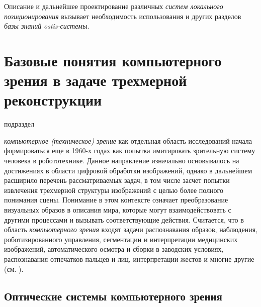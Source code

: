 Описание и дальнейшее проектирование различных \textit{систем локального позиционирования} вызывает необходимость использования и других разделов \textit{базы знаний} \textit{ostis-системы}. 

\section{Базовые понятия компьютерного зрения в задаче трехмерной реконструкции}
\label{sec_3d_models_computervision}

\begin{scnrelfromlist}{подраздел}
\end{scnrelfromlist}

\textit{компьютерное (техническое) зрение} как отдельная область исследований начала формироваться еще в 1960-х годах как попытка имитировать зрительную систему человека в робототехнике. Данное направление изначально основывалось на достижениях в области цифровой обработки изображений, однако в дальнейшем расширило перечень рассматриваемых задач, в том числе засчет попытки извлечения трехмерной структуры изображений с целью более полного понимания сцены. Понимание в этом контексте означает преобразование визуальных образов в описания мира, которые могут взаимодействовать с другими процессами и вызывать соответствующие действия. Считается, что в область \textit{компьютерного зрения} входят задачи распознавания образов, наблюдения, роботизированного управления, сегментации и интерпретации медицинских изображений, автоматического осмотра и сборки в заводских условиях, распознавания отпечатков пальцев и лиц, интерпретации жестов и многие другие (см. ).

\begin{SCn}
\end{SCn}

\subsection{Оптические системы компьютерного зрения}
\label{sec_3d_models_computervision_opt_systems}

